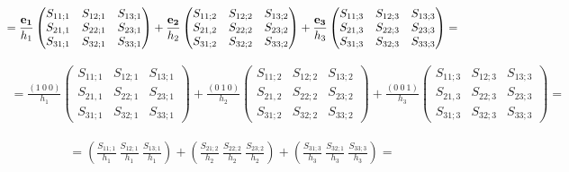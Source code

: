 \documentclass[11pt]{article}
\begin{document}
\begin{align}
= \frac{{\bf{e_1}}}{h_1}
\begin{pmatrix}
 S_{11;1} &  S_{12;1} &  S_{13;1}  \\
 S_{21,1} &  S_{22;1} &  S_{23;1} \\
 S_{31;1} &  S_{32;1} &  S_{33;1} 
\end{pmatrix} +
\frac{{\bf{e_2}}}{h_2}
\begin{pmatrix}
 S_{11;2} &  S_{12;2} &  S_{13;2}  \\
 S_{21,2} &  S_{22;2} &  S_{23;2} \\
 S_{31;2} &  S_{32;2} &  S_{33;2} 
\end{pmatrix} +
\frac{{\bf{e_3}}}{h_3}
\begin{pmatrix}
 S_{11;3} &  S_{12;3} &  S_{13;3}  \\
 S_{21,3} &  S_{22;3} &  S_{23;3} \\
 S_{31;3} &  S_{32;3} &  S_{33;3} 
\end{pmatrix} =
\end{align}

\begin{align}
= \frac{(1 \ 0 \ 0)}{h_1}
\begin{pmatrix}
 S_{11;1} &  S_{12;1} &  S_{13;1}  \\
 S_{21,1} &  S_{22;1} &  S_{23;1} \\
 S_{31;1} &  S_{32;1} &  S_{33;1} 
\end{pmatrix} +
\frac{(0 \ 1 \ 0)}{h_2}
\begin{pmatrix}
 S_{11;2} &  S_{12;2} &  S_{13;2}  \\
 S_{21,2} &  S_{22;2} &  S_{23;2} \\
 S_{31;2} &  S_{32;2} &  S_{33;2} 
\end{pmatrix} +
\frac{(0 \ 0 \ 1)}{h_3}
\begin{pmatrix}
 S_{11;3} &  S_{12;3} &  S_{13;3}  \\
 S_{21,3} &  S_{22;3} &  S_{23;3} \\
 S_{31;3} &  S_{32;3} &  S_{33;3} 
\end{pmatrix} = 
\end{align}

\begin{align}
= \left( \frac{S_{11;1}}{h_1} \ \frac{S_{12;1}}{h_1} \ \frac{S_{13;1}}{h_1} \right) + \left( \frac{S_{21;2}}{h_2} \ \frac{S_{22;2}}{h_2} \ \frac{S_{23;2}}{h_2} \right) + \left( \frac{S_{31;3}}{h_3} \ \frac{S_{32;1}}{h_3} \ \frac{S_{33;3}}{h_3} \right) = 
\end{align}
\end{document}
